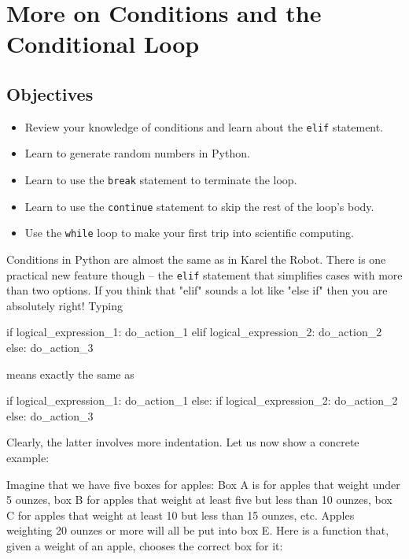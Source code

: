 \section{More on Conditions and the Conditional Loop} \label{sec:while}

\subsection{Objectives}

\begin{itemize}
\item Review your knowledge of conditions and learn about the {\tt elif} statement.
\item Learn to generate random numbers in Python.
\item Learn to use the {\tt break} statement to terminate the loop.
\item Learn to use the {\tt continue} statement to skip the rest of the loop's body.
\item Use the {\tt while} loop to make your first trip into scientific computing.
\end{itemize}
Conditions in Python are almost the same as in Karel the Robot. There is one practical 
new feature though -- the {\tt elif} statement that simplifies 
cases with more than two options. If you think that "elif" sounds a lot like "else if" then 
you are absolutely right! Typing 

\begin{bluecode}
    if logical_expression_1:
        do_action_1
    elif logical_expression_2:
        do_action_2
    else:
        do_action_3
\end{bluecode}
means exactly the same as

\begin{bluecode}
    if logical_expression_1:
        do_action_1
    else:
        if logical_expression_2:
            do_action_2
        else:
            do_action_3
\end{bluecode}
Clearly, the latter involves more indentation. Let us now show a concrete example:

Imagine that we have five boxes for apples: Box A is for apples that weight under 
5 ounzes, box B for apples that weight at least five but less than 10 ounzes, 
box C for apples that weight at least 10 but less than 15 ounzes, etc. Apples weighting 
20 ounzes or more will all be put into box E. Here is a function that, given 
a weight of an apple, chooses the correct box for it:


